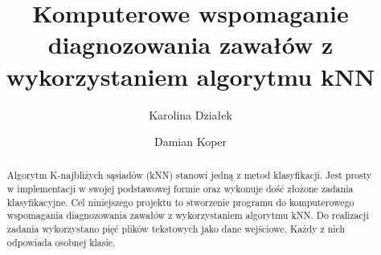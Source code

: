 \documentclass[runningheads]{llncs2e/llncs}
\begin{document}
\title{Komputerowe wspomaganie diagnozowania zawałów z wykorzystaniem algorytmu kNN}

%
%
\author{Karolina Działek \and
    Damian Koper
}
%
%
%
\maketitle              %
%
\begin{abstract}
    Algorytm K-najbliżych sąsiadów (kNN) stanowi jedną z metod klasyfikacji. Jest prosty w implementacji w swojej podstawowej formie oraz wykonuje dość złożone zadania klasyfikacyjne. Cel niniejszego projektu to stworzenie programu do komputerowego wspomagania diagnozowania zawałów z wykorzystaniem algorytmu kNN. Do realizacji zadania wykorzystano pięć plików tekstowych jako dane wejściowe. Każdy z nich odpowiada osobnej klasie.

\end{abstract}
%


%
\clearpage
%
%
%


%
\end{document}
